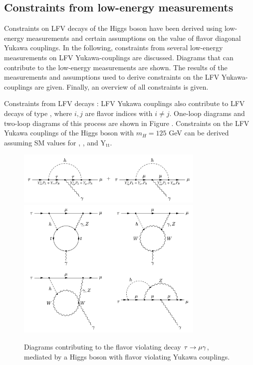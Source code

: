 \subsection{Constraints from low-energy measurements}

Constraints on LFV decays of the Higgs boson have been derived using low-energy measurements and certain assumptions on the value of flavor diagonal Yukawa couplings. In the following, constraints from several low-energy measurements on LFV Yukawa-couplings are discussed. Diagrams that can contribute to the low-energy measurements are shown. The results of the measurements and assumptions used to derive constraints on the LFV Yukawa-couplings are given. Finally, an overview of all constraints is given.

Constraints from LFV decays \liljg: LFV Yukawa couplings also contribute to LFV decays of type \liljg, where $i, j$ are flavor indices with $i \neq j$. One-loop diagrams and two-loop diagrams of this process are shown in Figure \cite{fig:tmg}. Constraints on the LFV Yukawa couplings of the Higgs boson with $m_{H} = 125$ GeV can be derived assuming SM values for \Ytt, \Ymm, and $\mathrm{Y}_{\mathrm{tt}}$.

\begin{figure}[htbp]
  \centering
  \includegraphics[width=0.8\textwidth]{plots/chapter2/1loop.png} \\
  \includegraphics[width=0.8\textwidth]{plots/chapter2/2loop.png}
  \caption{Diagrams contributing to the flavor violating decay $\tau \to \mu \gamma$, mediated by a Higgs boson with flavor violating Yukawa couplings.}
  \label{fig:tmg}
\end{figure}


